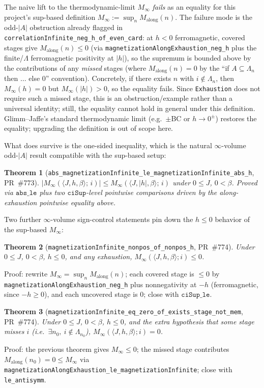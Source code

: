 \documentclass[a4paper,11pt]{article}
\newtheorem{theorem}{Theorem}
\begin{document}
The naive lift to the thermodynamic-limit $M_\infty$ \emph{fails} as an
equality for this project's sup-based definition
$M_\infty := \sup_n M_\text{along}(n)$. The failure mode is the
odd-$|A|$ obstruction already flagged in
\texttt{correlationInfinite\_neg\_h\_of\_even\_card}: at $h < 0$
ferromagnetic, covered stages give $M_\text{along}(n) \le 0$
(via \texttt{magnetizationAlongExhaustion\_neg\_h} plus the finite/\(\Lambda\)
ferromagnetic positivity at $|h|$), so the supremum is bounded above
by the contributions of any \emph{missed} stages (where
$M_\text{along}(n) = 0$ by the ``if $A \subseteq \Lambda_n$ then
$\ldots$ else $0$'' convention). Concretely, if there exists
$n$ with $i \notin \Lambda_n$, then $M_\infty(h) = 0$ but
$M_\infty(|h|) > 0$, so the equality fails. Since
\texttt{Exhaustion} does not require such a missed stage, this is an
obstruction/example rather than a universal identity; still, the
equality cannot hold in general under this definition.
Glimm--Jaffe's standard thermodynamic limit
(e.g.\ $\pm$BC or $h \to 0^\pm$) restores the equality; upgrading the
definition is out of scope here.

What does survive is the one-sided inequality, which is the natural
$\infty$-volume odd-$|A|$ result compatible with the sup-based setup:
\begin{theorem}[\texttt{abs\_magnetizationInfinite\_le\_magnetizationInfinite\_abs\_h}, PR~\#773]
$|M_\infty(\langle J,h,\beta\rangle;\,i)|
 \le M_\infty(\langle J,|h|,\beta\rangle;\,i)$
under $0 \le J$, $0 < \beta$. Proved via $\mathtt{abs\_le}$ plus two
$\mathtt{ciSup}$-level pointwise comparisons driven by the along-exhaustion
pointwise equality above.
\end{theorem}

Two further $\infty$-volume sign-control statements pin down the
$h \le 0$ behavior of the sup-based $M_\infty$:
\begin{theorem}[\texttt{magnetizationInfinite\_nonpos\_of\_nonpos\_h}, PR~\#774]
Under $0 \le J$, $0 < \beta$, $h \le 0$, and any exhaustion,
$M_\infty(\langle J, h, \beta\rangle; i) \le 0$.
\end{theorem}
\noindent Proof: rewrite $M_\infty = \sup_n M_\text{along}(n)$; each
covered stage is $\le 0$ by \texttt{magnetizationAlongExhaustion\_neg\_h}
plus nonnegativity at $-h$ (ferromagnetic, since $-h \ge 0$), and each
uncovered stage is $0$; close with $\mathtt{ciSup\_le}$.

\begin{theorem}[\texttt{magnetizationInfinite\_eq\_zero\_of\_exists\_stage\_not\_mem}, PR~\#774]
Under $0 \le J$, $0 < \beta$, $h \le 0$, and the extra hypothesis that
some stage misses $i$ (i.e.\ $\exists n_0,\ i \notin \Lambda_{n_0}$),
$M_\infty(\langle J, h, \beta\rangle; i) = 0$.
\end{theorem}
\noindent Proof: the previous theorem gives $M_\infty \le 0$; the
missed stage contributes $M_\text{along}(n_0) = 0 \le M_\infty$ via
\texttt{magnetizationAlongExhaustion\_le\_magnetizationInfinite};
close with \texttt{le\_antisymm}.
\end{document}
